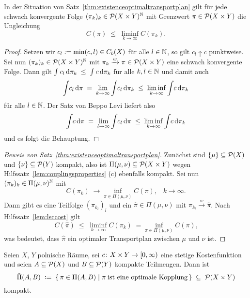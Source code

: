 \documentclass[../main/main.tex]{subfiles}
\begin{document}
	\begin{Hilfssatz}
		\label{lem:lsccost}
		In der Situation von Satz~\ref{thm:existenceoptimaltransportplan} gilt für jede schwach konvergente Folge $(\pi_k)_k \in \mathcal{P}(X \times Y)^{\mathbb{N}}$ mit Grenzwert $\pi \in \mathcal{P}(X \times Y)$ die Ungleichung
		\[ C(\pi) \; \leq \; \liminf_{k \to \infty} C(\pi_k) \text{.} \]
	\end{Hilfssatz}

	\begin{proof}
		Setzen wir $c_l \vcentcolon = \min(c, l) \in C_b(X)$ für alle $l \in \mathbb{N}$, so gilt $c_l \uparrow c$ punktweise. Sei nun $(\pi_k)_k \in \mathcal{P}(X \times Y)^{\mathbb{N}}$ mit $\pi_k \xrightarrow{w} \pi \in \mathcal{P}(X \times Y)$ eine schwach konvergente Folge. Dann gilt
		$\int_{} \, c_l \, \mathrm{d}\pi_k \; \leq \; \int_{} \, c \, \mathrm{d}\pi_k$ für alle $k, l \in \mathbb{N}$ und damit auch 
		\[ \int_{} \, c_l \, \mathrm{d}\pi \; = \; \lim_{k \to \infty} \int_{} \, c_l \, \mathrm{d}\pi_k \; \leq \; \liminf_{k \to \infty} \int_{} \, c \, \mathrm{d}\pi_k \]
		für alle $l \in \mathbb{N}$. Der Satz von Beppo Levi liefert also
		\[ \int_{} \, c \, \mathrm{d}\pi \; = \; \lim_{l \to \infty} \int_{} \, c_l \, \mathrm{d}\pi \; \leq \; \liminf_{k \to \infty} \int_{} \, c \, \mathrm{d}\pi_k \]
		und es folgt die Behauptung.
	\end{proof}

	\begin{proof}[Beweis von Satz~\ref{thm:existenceoptimaltransportplan}]
		Zunächst sind $\left\{\mu\right\} \subseteq \mathcal{P}(X)$ und $\left\{\nu\right\} \subseteq \mathcal{P}(Y)$ kompakt, also ist $\Pi(\mu, \nu) \subseteq \mathcal{P}(X \times Y)$ 
		wegen Hilfssatz~\ref{lem:couplingsproperties} (c) ebenfalls kompakt.
		Sei nun $(\pi_k)_k \in \Pi(\mu, \nu)^{\mathbb{N}}$ mit
		\[ C(\pi_k) \; \to \inf_{\pi \in \Pi(\mu, \nu)} C(\pi) \text{,} \quad k \to \infty \text{.} \]
		Dann gibt es eine Teilfolge $(\pi_{k_l})_l$ und ein $\hat{\pi} \in \Pi(\mu, \nu)$ mit $\pi_{k_l} \xrightarrow{w} \hat{\pi}$. Nach Hilfssatz~\ref{lem:lsccost} gilt
		\[ C(\hat{\pi}) \; \leq \; \liminf_{k \to \infty} C(\pi_k) \; = \inf_{\pi \in \Pi(\mu, \nu)} C(\pi) \text{,} \]
		was bedeutet, dass $\hat{\pi}$ ein optimaler Transportplan zwischen $\mu$ und $\nu$ ist. 
	\end{proof}

	\begin{Satz}
		\label{thm:optimalplanscompact}
		Seien $X$, $Y$ polnische Räume, sei $c \colon X \times Y \to [0, \infty)$ eine stetige Kostenfunktion und seien $A \subseteq \mathcal{P}(X)$ und $B \subseteq \mathcal{P}(Y)$ kompakte Teilmengen.
		Dann ist 
		\[ \hat{\Pi}(A, B) \; \vcentcolon = \; \left\{\, \pi \in \Pi(A, B) \; \middle| \; \pi \; \text{ist eine optimale Kopplung} \,\right\} \; \subseteq \; \mathcal{P}(X \times Y) \]
		kompakt.
	\end{Satz}
\end{document}
